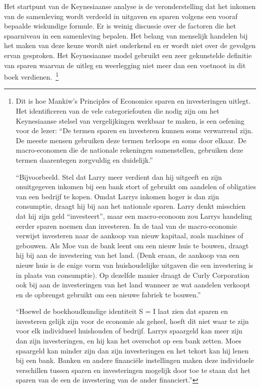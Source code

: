 Het startpunt van de Keynesiaanse analyse is de veronderstelling dat het inkomen van de samenleving wordt verdeeld in uitgaven en sparen volgens een vooraf bepaalde wiskundige formule. Er is weinig discussie over de factoren die het spaarniveau in een samenleving bepalen. Het belang van menselijk handelen bij het maken van deze keuze wordt niet onderkend en er wordt niet over de gevolgen ervan gesproken. Het Keynesiaanse model gebruikt een zeer gekunstelde definitie van sparen waarvan de uitleg en weerlegging niet meer dan een voetnoot in dit boek verdienen.~\footnote{Dit is hoe Mankiw's Principles of Economics sparen en investeringen uitlegt. Het identificeren van de vele categoriefouten die nodig zijn om het Keynesiaanse stelsel van vergelijkingen werkbaar te maken, is een oefening voor de lezer: ``De termen sparen en investeren kunnen soms verwarrend zijn. De meeste mensen gebruiken deze termen terloops en soms door elkaar. De macro-economen die de nationale rekeningen samenstellen, gebruiken deze termen daarentegen zorgvuldig en duidelijk.''

\hspace{1em}``Bijvoorbeeld. Stel dat Larry meer verdient dan hij uitgeeft en zijn onuitgegeven inkomen bij een bank stort of gebruikt om aandelen of obligaties van een bedrijf te kopen. Omdat Larry\textquotesingle s inkomen hoger is dan zijn consumptie, draagt hij bij aan het nationale sparen. Larry denkt misschien dat hij zijn geld ``investeert'', maar een macro-econoom zou Larry\textquotesingle s handeling eerder sparen noemen dan investeren. In de taal van de macro-economie verwijst investeren naar de aankoop van nieuw kapitaal, zoals machines of gebouwen. Als Moe van de bank leent om een nieuw huis te bouwen, draagt hij bij aan de investering van het land. (Denk eraan, de aankoop van een nieuw huis is de enige vorm van huishoudelijke uitgaven die een investering is in plaats van consumptie). Op dezelfde manier draagt de Curly Corporation ook bij aan de investeringen van het land wanneer ze wat aandelen verkoopt en de opbrengst gebruikt om een nieuwe fabriek te bouwen.''

\hspace{1em}``Hoewel de boekhoudkundige identiteit S = I laat zien dat sparen en investeren gelijk zijn voor de economie als geheel, hoeft dit niet waar te zijn voor elk individueel huishouden of bedrijf. Larry\textquotesingle s spaargeld kan meer zijn dan zijn investeringen, en hij kan het overschot op een bank zetten. Moe\textquotesingle s spaargeld kan minder zijn dan zijn investeringen en het tekort kan hij lenen bij een bank. Banken en andere financiële instellingen maken deze individuele verschillen tussen sparen en investeringen mogelijk door toe te staan dat het sparen van de een de investering van de ander financiert.''}

